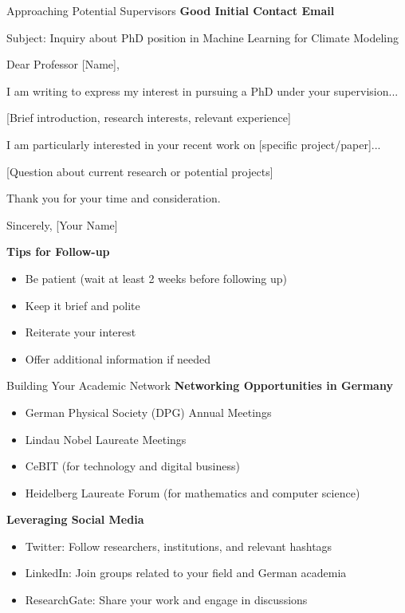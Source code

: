 \documentclass[aspectratio=169,10pt]{beamer}
\begin{document}
\begin{frame}{Approaching Potential Supervisors}
\textbf{Good Initial Contact Email}
\begin{tcolorbox}[colback=green!5,colframe=green!40!black]
Subject: Inquiry about PhD position in Machine Learning for Climate Modeling

Dear Professor [Name],

I am writing to express my interest in pursuing a PhD under your supervision...

[Brief introduction, research interests, relevant experience]

I am particularly interested in your recent work on [specific project/paper]...

[Question about current research or potential projects]

Thank you for your time and consideration.

Sincerely,
[Your Name]
\end{tcolorbox}

\textbf{Tips for Follow-up}
\begin{itemize}
    \item Be patient (wait at least 2 weeks before following up)
    \item Keep it brief and polite
    \item Reiterate your interest
    \item Offer additional information if needed
\end{itemize}
\end{frame}

\begin{frame}{Building Your Academic Network}
\textbf{Networking Opportunities in Germany}
\begin{itemize}
    \item German Physical Society (DPG) Annual Meetings
    \item Lindau Nobel Laureate Meetings
    \item CeBIT (for technology and digital business)
    \item Heidelberg Laureate Forum (for mathematics and computer science)
\end{itemize}

\vspace{0.5cm}

\textbf{Leveraging Social Media}
\begin{itemize}
    \item Twitter: Follow researchers, institutions, and relevant hashtags
    \item LinkedIn: Join groups related to your field and German academia
    \item ResearchGate: Share your work and engage in discussions
\end{itemize}
\end{frame}
\end{document}
